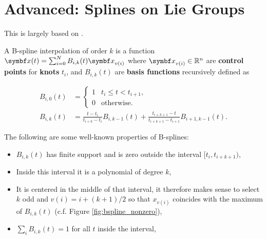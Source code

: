 
\chapter{Advanced: Splines on Lie Groups}

This is largely based on \cite{patron-perez_spline-based_2015, sommer_efficient_2020}.


\begin{figure}[h]
  \begin{center}
  \end{center}
\end{figure}

A B-spline interpolation of order $k$ is a function $\x(t) = \sum_{i=0}^N B_{i, k}(t) \x_{v(i)}$ where $\x_{v(i)} \in \mathbb{R}^n$ are \textbf{control points} for \textbf{knots} $t_i$, and $B_{i, k}(t)$ are \textbf{basis functions} recursively defined as

\begin{equation}
  \label{eq:b_spline_rec}
  \begin{aligned}
    B_{i, 0}(t) & = \begin{cases}
      1 & t_i \leq t < t_{i+1}, \\
      0 & \text{otherwise}.
    \end{cases}                                                                                \\
    B_{i, k}(t) & = \frac{t - t_i}{t_{i+k} - t_i} B_{i, k-1}(t) + \frac{t_{i+k+1} - t}{t_{i+k+1} - t_{i+1}} B_{i+1, k-1}(t).
  \end{aligned}
\end{equation}

The following are some well-known properties of B-splines:
\begin{itemize}
  \item $B_{i, k}(t)$ has finite support and is zero outside the interval $[t_{i}, t_{i+k+1})$,
  \item Inside this interval it is a polynomial of degree $k$,
  \item It is centered in the middle of that interval, it therefore makes sense to select $k$ odd and $v(i) = i + (k + 1) / 2$ so that $x_{v(i)}$ coincides with the maximum of $B_{i, k}(t)$ (c.f. Figure \ref{fig:bspline_nonzero}),
  \item $\sum_i B_{i, k}(t) = 1$ for all $t$ inside the interval,
\end{itemize}

